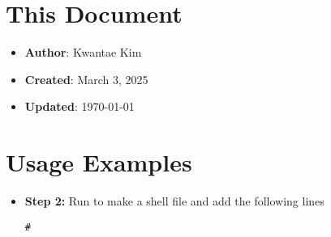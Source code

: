 \documentclass[a4paper,12pt]{article}
\begin{document}
\section{This Document}

\begin{itemize}
    \item \textbf{Author}: Kwantae Kim
    \item \textbf{Created}: March 3, 2025
    \item \textbf{Updated}: \today
\end{itemize}

\pagebreak


\section{Usage Examples}

\begin{itemize}
    \item[\footnotesize\faCode] \textbf{Step 2:} Run  to make a shell file and add the following lines
          \begin{tcolorbox}[colback=black!5,colframe=black!50,arc=1mm]
              \texttt{\#} \\
          \end{tcolorbox}
\end{itemize}

\label{lastpage}
\end{document}
